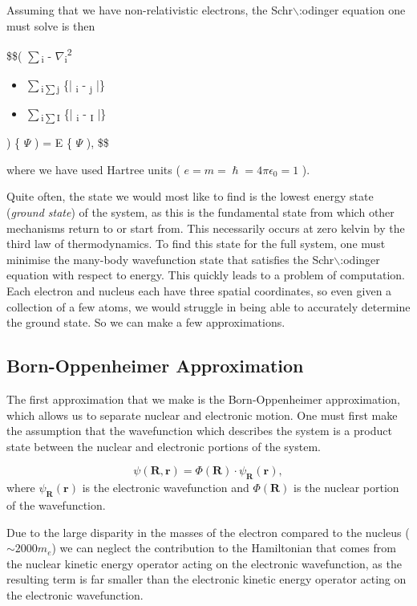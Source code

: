 \documentclass[11pt]{article}
\begin{document}
Assuming that we have non-relativistic electrons, the Schr$\backslash$:odinger equation one must solve is then 

\$\$\Big( 
   \(\sum\)\textsubscript{i} - \(\nabla\)\textsubscript{i}\textsuperscript{2} 
\begin{itemize}
\item {} \(\sum\)\textsubscript{i\(\sum\)}\textsubscript{j}    \{| \textsubscript{i} - \textsubscript{j} |\}
\item \(\sum\)\textsubscript{i\(\sum\)}\textsubscript{I} \{| \textsubscript{i} - \textsubscript{I} |\}
\end{itemize}
\Big) \mathbf\{ \(\Psi\) ) = E \mathbf\{ \(\Psi\) ), \$\$

where we have used Hartree units ( \(e = m = \hslash = 4\pi\epsilon_0 = 1\) ). 


Quite often, the state we would most like to find is the lowest energy state (\emph{ground state})
of the system, as this is the fundamental state from which other mechanisms return to or start
from. This necessarily occurs at zero kelvin by the third law of thermodynamics. To find this
state for the full system, one must minimise the many-body wavefunction state that satisfies
the Schr$\backslash$:odinger equation with respect to energy. This quickly leads to a problem of
computation. Each electron and nucleus each have three spatial coordinates, so even given a
collection of a few atoms, we would struggle in being able to accurately determine the ground
state. So we can make a few approximations. 

\subsection{Born-Oppenheimer Approximation}
\label{sec:orgdde7de6}

The first approximation that we make is the Born-Oppenheimer approximation, which allows us to
separate nuclear and electronic motion. One must first make the assumption that the
wavefunction which describes the system is a product state between the nuclear and electronic
portions of the system.

$$ \psi(\mathbf{R}, \mathbf{r}) = \Phi(\mathbf{R}) \cdot \psi_{\mathbf{R}}(\mathbf{r}), $$
where \(\psi_{\mathbf{R}}(\mathbf{r})\) is the electronic wavefunction and \(\Phi(\mathbf{R})\) is
the nuclear portion of the wavefunction.

 Due to the large disparity in the masses of the
electron compared to the nucleus (\(\sim 2000 m_e\)) we can neglect the contribution to the
Hamiltonian that comes from the nuclear kinetic energy operator acting on the electronic
wavefunction, as the resulting term is far smaller than the electronic kinetic energy operator acting on the
electronic wavefunction.
\end{document}
